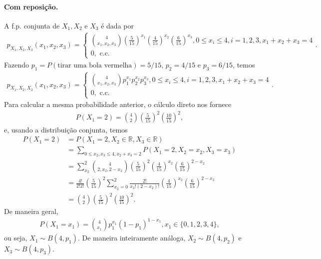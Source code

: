 \documentclass[../Notas.tex]{subfiles}
\begin{document}
\begin{example}
\paragraph{Com reposição.} A f.p. conjunta de $X_1, X_2$ e $X_3$ é dada por
\begin{align*}
    p_{X_1, X_2, X_3}(x_1, x_2, x_3) = \begin{cases}
    \binom{4}{x_1, x_2, x_3}\left( \frac{5}{15} \right)^{x_1}\left( \frac{4}{15} \right)^{x_2}\left( \frac{6}{15} \right)^{x_3}, 0\leq x_i\leq 4, i=1,2,3, x_1+x_2+x_3=4 \\
    0, \text{ c.c.}
    \end{cases}.
\end{align*}
Fazendo $p_1 = P(\text{tirar uma bola vermelha}) = 5/15$, $p_2 = 4/15$ e $p_3 = 6/15$, temos
\begin{align*}
    p_{X_1, X_2, X_3}(x_1, x_2, x_3) = \begin{cases}
    \binom{4}{x_1, x_2, x_3}p_1^{x_1}p_2^{x_2}p_3^{x_3}, 0\leq x_i\leq 4, i=1,2,3, x_1+x_2+x_3=4 \\
    0, \text{ c.c.}
    \end{cases}.
\end{align*}
Para calcular a mesma probabilidade anterior, o cálculo direto nos fornece
\begin{align*}
    P(X_1 = 2) = \binom{4}{2}\left(\frac{5}{15}\right)^2\left(\frac{10}{15}\right)^2,
\end{align*}
e, usando a distribuição conjunta, temos
\begin{align*}
    P(X_1 = 2) &= P(X_1 = 2, X_2\in\mathbb{R}, X_3\in\mathbb{R}) \\
    &= \sum_{0\leq x_2,x_3\leq 4, x_2+x_3=2} P(X_1 = 2, X_2=x_2, X_3=x_3) \\
    &= \sum_{x_2}^{2}\binom{4}{2, x_2, 2-x_2}\left(\frac{5}{15}\right)^2\left(\frac{4}{15}\right)^{x_2}\left(\frac{6}{15}\right)^{2-x_2} \\
    &= \frac{4!}{2!2!}\left(\frac{5}{15}\right)^2\sum_{x_2=0}^{2} \frac{2!}{x_2!(2-x_2)!}\left(\frac{4}{15}\right)^{x_2}\left(\frac{6}{15}\right)^{2-x_2} \\
    &= \binom{4}{2}\left(\frac{5}{15}\right)^2\left(\frac{10}{15}\right)^2.
\end{align*}
De maneira geral,
\begin{align*}
    P(X_1=x_1) = \binom{4}{x_1}p_1^{x_1}(1-p_1)^{1-x_1}, x_1\in\{0, 1, 2, 3, 4\},
\end{align*}
ou seja, $X_1\sim B(4,p_1)$. De maneira inteiramente análoga, $X_2\sim B(4,p_2)$ e $X_3\sim B(4,p_3)$.
\end{example}
\end{document}
